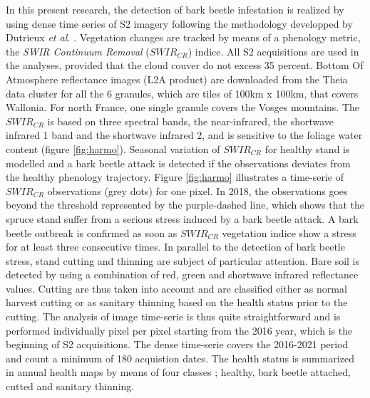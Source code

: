 \documentclass[3p,times]{elsarticle}
\begin{document}
In this present research, the detection of bark beetle infestation is realized by using dense time series of S2 imagery following the methodology developped by Dutrieux \textit{et al.} \citep{dutrieux_package_2021}.
Vegetation changes are tracked by means of a phenology metric, the \textit{SWIR Continuum Removal} ($SWIR_{CR}$) indice.
All S2 acquisitions are used in the analyses, provided that the cloud couver do not excess 35 percent.  Bottom Of Atmosphere reflectance images (L2A product) are downloaded from the Theia data cluster \citep{theia_team_value-added_nodate} for all the 6 granules, which are tiles of 100km x 100km, that covers Wallonia. 
For north France, one single granule covers the Vosges mountains.
The $SWIR_{CR}$ is based on three spectral bands, the near-infrared, the shortwave infrared 1 band and the shortwave infrared 2, and is sensitive to the foliage water content (figure \ref{fig:harmo}).
Seasonal variation of $SWIR_{CR}$ for healthy stand is modelled and a bark beetle attack is detected if the observations deviates from the healthy phenology trajectory. 
Figure \ref{fig:harmo} illustrates a time-serie of $SWIR_{CR}$ observations (grey dots) for one pixel. 
In 2018, the observations goes beyond the threshold represented by the purple-dashed line, which shows that the spruce stand suffer from a serious stress induced by a bark beetle attack.
A bark beetle outbreak is confirmed as soon as $SWIR_{CR}$ vegetation indice show a stress for at least three consecutive times.
In parallel to the detection of bark beetle stress, stand cutting and thinning are subject of particular attention. 
Bare soil is detected by using a combination of red, green and shortwave infrared reflectance values.
Cutting are thus taken into account and are classified either as normal harvest cutting or as sanitary thinning based on the health status prior to the cutting.
The analysis of image time-serie is thus quite straightforward and is performed individually pixel per pixel starting from the 2016 year, which is the beginning of S2 acquisitions. 
The dense time-serie covers the 2016-2021 period and count a minimum of 180 acquistion dates. 
The health status is summarized in annual health maps by means of four classes ; healthy, bark beetle attached, cutted and sanitary thinning.
\end{document}
